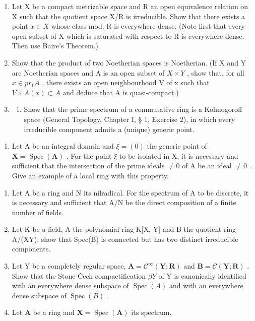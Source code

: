 \begin{enumerate}
\def\labelenumi{\arabic{enumi}.}
\setcounter{enumi}{6}
\item
  Let X be a compact metrizable space and R an open equivalence relation on X such that the quotient space X/R is irreducible. Show that there exists a point \(x \in X\) whose class mod. R is everywhere dense. (Note first that every open subset of X which is saturated with respect to R is everywhere dense. Then use Baire's Theorem.)
\item
  Show that the product of two Noetherian spaces is Noetherian. (If X and Y are Noetherian spaces and A is an open subset of \(X \times Y\) , show that, for all \(x \in pr_{1}A\) , there exists an open neighbourhood V of x such that \(V \times A(x) \subset A\) and deduce that A is quasi-compact.)
\item
  \begin{enumerate}
  \def\labelenumii{(\alph{enumii})}
  \tightlist
  \item
    Show that the prime spectrum of a commutative ring is a Kolmogoroff space (General Topology, Chapter I, § 1, Exercise 2), in which every irreducible component admits a (unique) generic point.
  \end{enumerate}
\end{enumerate}

\begin{enumerate}
\def\labelenumi{(\alph{enumi})}
\setcounter{enumi}{1}
\tightlist
\item
  Let A be an integral domain and \(\xi = (0)\) the generic point of \(\mathbf{X} = \operatorname{Spec}(\mathbf{A})\) . For the point \(\xi\) to be isolated in X, it is necessary and sufficient that the intersection of the prime ideals \(\neq 0\) of A be an ideal \(\neq 0\) . Give an example of a local ring with this property.
\end{enumerate}

\begin{enumerate}
\def\labelenumi{\arabic{enumi}.}
\setcounter{enumi}{9}
\item
  Let A be a ring and N its nilradical. For the spectrum of A to be discrete, it is necessary and sufficient that A/N be the direct composition of a finite number of fields.
\item
  Let K be a field, A the polynomial ring K{[}X, Y{]} and B the quotient ring A/(XY); show that Spec(B) is connected but has two distinct irreducible components.
\item
  Let Y be a completely regular space, \(\mathbf{A} = \mathcal{C}^{\infty}(\mathbf{Y}; \mathbf{R})\) and \(\mathbf{B} = \mathcal{C}(\mathbf{Y}; \mathbf{R})\) . Show that the Stone-Čech compactification \(\beta Y\) of Y is canonically identified with an everywhere dense subspace of \(\operatorname{Spec}(A)\) and with an everywhere dense subspace of \(\operatorname{Spec}(B)\) .
\item
  Let \(\mathbf{A}\) be a ring and \(\mathbf{X} = \operatorname{Spec}(\mathbf{A})\) its spectrum.
\end{enumerate}

